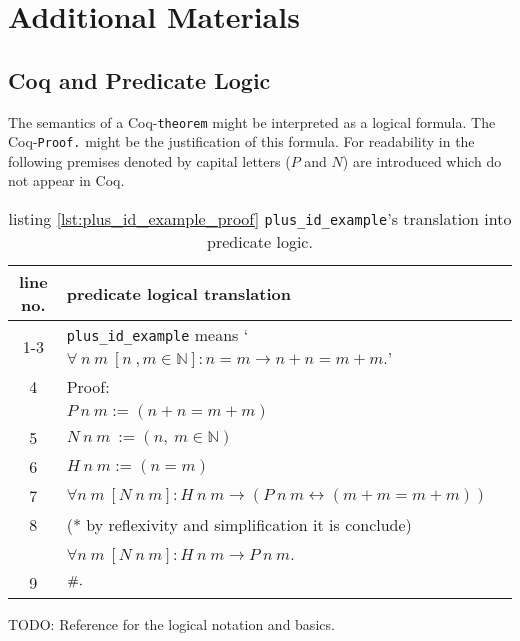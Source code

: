 \section{Additional Materials}
\label{app:AdditionalMaterials}

\subsection{Coq and Predicate Logic} \label{subsec:CoqAndPredicateLogic}
	The semantics of a Coq-\lstinline!theorem! might be interpreted as a logical formula.
	The Coq-\lstinline!Proof.! might be the justification of this formula. 
	For readability in the following premises denoted by capital letters ($P$ and $N$) are introduced which do not appear in Coq.
	\begin{table}[h]
		\begin{center}
			\begin{tabular}{|c|l|}
			    \hline
	 			line no.  &  predicate logical translation \\  \hline
		     	  1-3    %
		                  & \lstinline!plus_id_example! means `$ \forall\ n\ m\ [n\ , m \in \mathbb{N}]: n = m \rightarrow n+n = m+m.$'\\ \hline        
		     	  4       & Proof: \\     	     	      	                      
		                  &   $ P\ n\ m:= (n+n = m+m)$    \\ \hline
		          5       &   $N \ n \ m \ := ( n,\ m \in \mathbb{N})$       \\ \hline       
		          6       &   $ H\ n\ m :=( n= m)$ \\        
		    	      7       &   $ \forall n \ m\ [N \ n\ m]: H\ n\ m \rightarrow (P\ n\ m \leftrightarrow( m+m = m+m))$\\   \hline 
		          8       &   (* by reflexivity and simplification it is conclude) \\
		                  & $\forall n\ m\ [ N\ n\ m]: H\ n\ m  \rightarrow P\ n\ m$.  \\  \hline
		          9       & $\qed.$\\ \hline        	          
	        		\end{tabular}
		\end{center}
		\label{tab:CoqAndPreciateLogic}
		\caption{listing \ref{lst:plus_id_example_proof} \lstinline!plus_id_example!'s translation into predicate logic.} 
	\end{table}

TODO: Reference for the logical notation and basics.